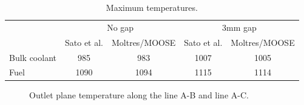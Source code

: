 \begin{table}[htbp!]
  \centering
  \caption{Maximum temperatures.}
  \label{tab:th-val-assem-results}
\begin{tabular}{l|c|c|c|c}
\toprule
        & \multicolumn{2}{c|}{No gap} & \multicolumn{2}{c}{3mm gap} \\ \cline{2-5}
        & Sato et al. & Moltres/MOOSE & Sato et al. & Moltres/MOOSE \\ \midrule
Bulk coolant & 985     & 983               & 1007     & 1005             \\  
Fuel    & 1090    & 1094              & 1115     & 1114             \\
\bottomrule
\end{tabular}
\end{table}

\begin{figure}[htbp!]
  \centering
  \hfill
  \caption{Outlet plane temperature along the line A-B and line A-C.}
  \label{fig:th-val-assem-temps}
\end{figure}


